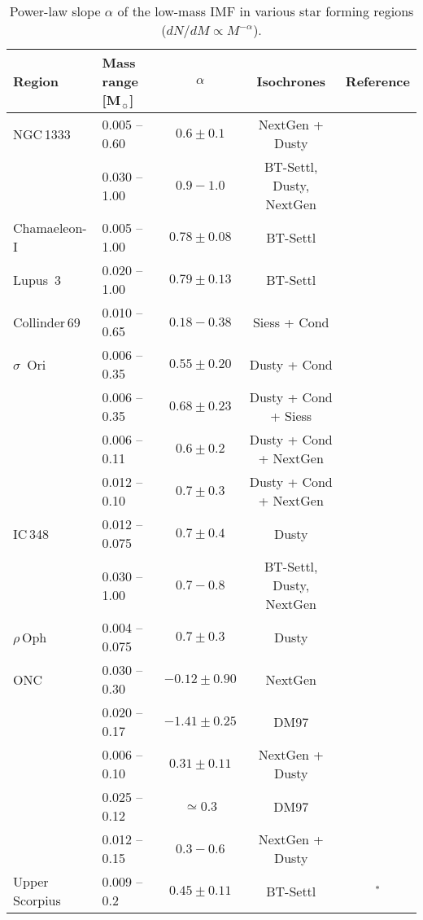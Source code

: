 \documentclass[a4paper,fleqn,usenatbib]{mnras}
\begin{document}
\begin{table*}
\caption{Power-law slope $\alpha$ of the low-mass IMF in various star forming regions ($dN/dM\propto M^{-\alpha}$).}%
\label{tab:slopes}
\begin{tabular}{llccc}
\hline
Region & Mass range [M$_{\sun}$] & $\alpha$ & Isochrones				& Reference\\
\hline
NGC\,1333 		& 0.005 -- 0.60		& $0.6\pm0.1$	& NextGen + Dusty				& \citet{scholz12a} \\
				& 0.030 -- 1.00		& $0.9 - 1.0$	& BT-Settl, Dusty, NextGen		& \citet{scholz13} \\
Chamaeleon-I 	& 0.005 -- 1.00		& $0.78\pm0.08$ & BT-Settl 						& \citet{muzic15} \\
Lupus~3 		& 0.020 -- 1.00 	& $0.79\pm0.13$	& BT-Settl 					& \citet{muzic15} \\
Collinder\,69 	& 0.010 -- 0.65		& $0.18 - 0.38$	& Siess + Cond					& \citet{bayo11} \\
$\sigma$~Ori	& 0.006 -- 0.35		& $0.55\pm0.20$	& Dusty + Cond					& \citet{penaramirez12} \\
				& 0.006 -- 0.35		& $0.68\pm0.23$	& Dusty + Cond + Siess			& \citet{penaramirez12} \\
				& 0.006 -- 0.11     & $0.6\pm0.2$	& Dusty + Cond + NextGen		& \citet{caballero07}\\
				& 0.012 -- 0.10		& $0.7 \pm 0.3$ & Dusty + Cond + NextGen    	& \citet{bejar11}\\
IC\,348 		& 0.012 -- 0.075	& $0.7\pm0.4$	& Dusty							& \citet{ado13}  \\
				& 0.030 -- 1.00		& $0.7 - 0.8$	& BT-Settl, Dusty, NextGen		& \citet{scholz13}  \\
$\rho$\,Oph 	& 0.004 -- 0.075	& $0.7\pm0.3$	& Dusty							& \citet{ado12} \\
ONC 			& 0.030 -- 0.30		& $-0.12 \pm 0.90 $	& NextGen					& \citet{dario12} \\
				& 0.020 -- 0.17		& $-1.41 \pm 0.25 $	& DM97						& \citet{dario12} \\
				& 0.006 -- 0.10		& $0.31\pm0.11$ &  	NextGen + Dusty				& \citet{lucas05} \\
				& 0.025 -- 0.12     & $\simeq 0.3 $  & 	DM97						& \citet{muench02} \\
				& 0.012	-- 0.15			& $0.3 - 0.6$	& NextGen + Dusty				& \citet{weights09} \\				
Upper Scorpius 	& 0.009 -- 0.2		& $0.45\pm0.11$	&  	BT-Settl					& \citet{lodieu13}$^{*}$\\

\end{tabular}
\end{table*}
\end{document}
